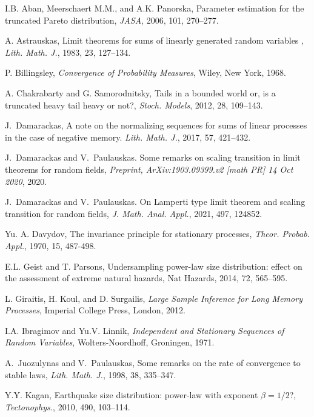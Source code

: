 \documentclass[12pt]{article}
\theoremstyle{plain}
\theoremstyle{definition}
\begin{document}
\begin{enumerate}
 I.B. Aban, Meerschaert M.M., and A.K. Panorska,
 Parameter estimation for the truncated {Pareto} distribution,
 {\em JASA}, 2006, {101}, 270--277.

A. Astrauskas, Limit theorems for sums of linearly generated random variables ,
{\em  Lith. Math. J.}, 1983,
{23}, 127--134.



 P. Billingsley, {\em Convergence of Probability Measures},
 Wiley, New York, 1968.


A. Chakrabarty and G. Samorodnitsky, Tails in a bounded world or, is a truncated heavy tail heavy or not?,
{\em Stoch. Models}, 2012, {28}, 109--143.

J.~Damarackas, A note on the normalizing sequences for sums of linear processes in
  the case of negative memory.
{\em Lith. Math. J.}, 2017, {57}, 421--432.

J.~Damarackas and V.~Paulauskas.
Some remarks on scaling transition in limit theorems for random fields,
{\em Preprint, ArXiv:1903.09399.v2 [math PR] 14 Oct 2020}, 2020.

J.~Damarackas and V.~Paulauskas.
 On {Lamperti} type limit theorem and scaling transition for random fields,
 {\em J. Math. Anal. Appl.}, 2021, {497}, 124852.


Yu. A. Davydov, The invariance principle for stationary processes,
{\em Theor. Probab. Appl.}, 1970, {15}, 487-498.

E.L. Geist and T. Parsons, Undersampling power-law size distribution: effect on the assessment of extreme natural hazards,
{Nat Hazards}, 2014, {72}, 565--595.

L. Giraitis, H. Koul, and D. Surgailis, {\em Large Sample Inference for Long Memory Processes},
Imperial College Press, London, 2012.



I.A. Ibragimov and Yu.V. Linnik, {\em Independent and Stationary Sequences of Random Variables},
 Wolters-Noordhoff, Groningen, 1971.

A.~Juozulynas and V.~Paulauskas, Some remarks on the rate of convergence to stable laws,
{\em Lith. Math. J.}, 1998, {38}, 335--347.

 Y.Y. Kagan, Earthquake size distribution: power-law with exponent $\beta=1/2$?,
 {\em Tectonophys.}, 2010, {490}, 103--114.


\end{enumerate}
\end{document}
